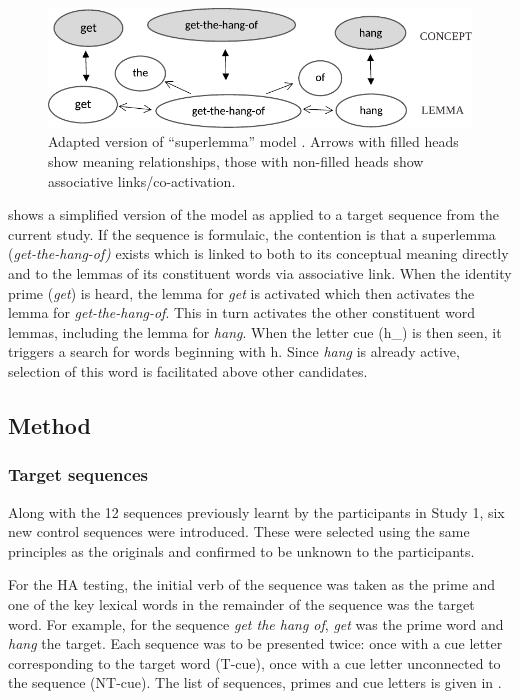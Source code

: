 \documentclass[output=paper]{langscibook}
\begin{document}
\begin{figure}
\caption{Adapted version of ``superlemma'' model \citep[1760]{SprengerEtAl2006}. Arrows with filled heads show meaning relationships, those with non-filled heads show associative links\slash co-activation.\label{fig:cutler:2}}
\includegraphics[width=\textwidth]{figures/cutlerFig2.pdf}
\end{figure}

 shows a simplified version of the model as applied to a target sequence from the current study. If the sequence is formulaic, the contention is that a superlemma (\textit{get-the-hang-of)} exists which is linked to both to its conceptual meaning directly and to the lemmas of its constituent words via associative link. When the identity prime (\textit{get}) is heard, the lemma for \textit{get} is activated which then activates the lemma for \textit{get-the-hang-of}. This in turn activates the other constituent word lemmas, including the lemma for \textit{hang}. When the letter cue (h\_) is then seen, it triggers a search for words beginning with h. Since \textit{hang} is already active, selection of this word is facilitated above other candidates.

\subsection{Method}
\subsubsection{Target sequences}


Along with the 12 sequences previously learnt by the participants in Study 1, six new control sequences were introduced. These were selected using the same principles as the originals and confirmed to be unknown to the participants. 

For the HA testing, the initial verb of the sequence was taken as the prime and one of the key lexical words in the remainder of the sequence was the target word. For example, for the sequence \textit{get the hang of}, \textit{get} was the prime word and \textit{hang} the target. Each sequence was to be presented twice: once with a cue letter corresponding to the target word (T-cue), once with a cue letter unconnected to the sequence (NT-cue). The list of sequences, primes and cue letters is given in .
\end{document}
